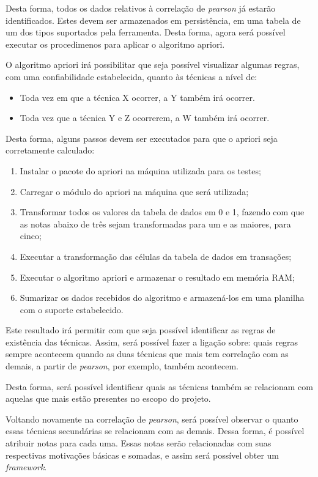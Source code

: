 Desta forma, todos os dados relativos à correlação de \textit{pearson} já estarão identificados. Estes devem ser armazenados em persistência,
em uma tabela de um dos tipos suportados pela ferramenta. Desta forma, agora será possível executar os procedimenos para aplicar
o algoritmo apriori.

O algoritmo apriori irá possibilitar que seja possível visualizar algumas regras, com uma confiabilidade estabelecida,
quanto às técnicas a nível de:
\begin{itemize}
    \item Toda vez em que a técnica X ocorrer, a Y também irá ocorrer.
    \item Toda vez que a técnica Y e Z ocorrerem, a W também irá ocorrer.
\end{itemize}

Desta forma, alguns passos devem ser executados para que o apriori seja corretamente calculado:

\begin{enumerate}
    \item Instalar o pacote do apriori na máquina utilizada para os testes;
    \item Carregar o módulo do apriori na máquina que será utilizada;
    \item Transformar todos os valores da tabela de dados em 0 e 1, fazendo com que as notas abaixo de três
        sejam transformadas para um e as maiores, para cinco;
    \item Executar a transformação das células da tabela de dados em transações;
    \item Executar o algoritmo apriori e armazenar o resultado em memória RAM;
    \item Sumarizar os dados recebidos do algoritmo e armazená-los em uma planilha com o suporte
        estabelecido.
\end{enumerate}

Este resultado irá permitir com que seja possível identificar as regras de existência das técnicas. Assim, será possível fazer
a ligação sobre: quais regras sempre acontecem quando as duas técnicas que mais tem correlação com as demais, a partir de \textit{pearson},
por exemplo, também acontecem.


Desta forma, será possível identificar quais as técnicas também se relacionam com aquelas que mais estão presentes no escopo do
projeto.

Voltando novamente na correlação de \textit{pearson}, será possível observar o quanto essas técnicas secundárias se relacionam com as demais. 
Dessa forma, é possível atribuir notas para cada uma. Essas notas serão relacionadas com suas respectivas motivações básicas e somadas, e assim
será possível obter um \textit{framework}.

